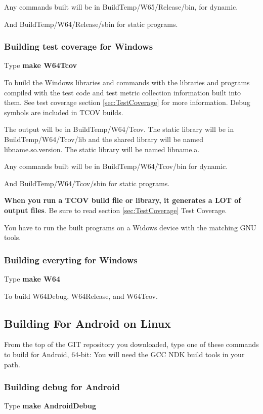 Any commands built will be in BuildTemp/W65/Release/bin,
for dynamic.
  
And BuildTemp/W64/Release/sbin for static programs.
  
\subsubsection{Building test coverage for Windows}
Type \textbf{make W64Tcov}

To build the Windows libraries and commands with the libraries
and programs compiled with the test code and test metric
collection information built into them.
See test coverage section \ref{sec:TestCoverage} for more information.
Debug symbols are included in TCOV builds.

The output will be in BuildTemp/W64/Tcov.
The static library will be in BuildTemp/W64/Tcov/lib
and the shared library will be named lib{name}.so.{version}.
The static library will be named lib{name}.a.
  
Any commands built will be in BuildTemp/W64/Tcov/bin
for dynamic.

And BuildTemp/W64/Tcov/sbin for static programs.

\textbf{When you run a TCOV build file or library, it generates a LOT of  output files}. Be sure to read section \ref{sec:TestCoverage}{ Test Coverage}.
  
You have to run the built programs on a Widows device
with the matching GNU tools.
  
\subsubsection{Building everyting for Windows}
Type \textbf{make W64}

To build W64Debug, W64Release, and W64Tcov.

\subsection{Building For Android on Linux}
  
From the top of the GIT repository you downloaded,
type one of these commands to build for Android, 64-bit:
You will need the GCC NDK build tools in your path.

\subsubsection{Building debug for Android}
Type \textbf{make AndroidDebug}

